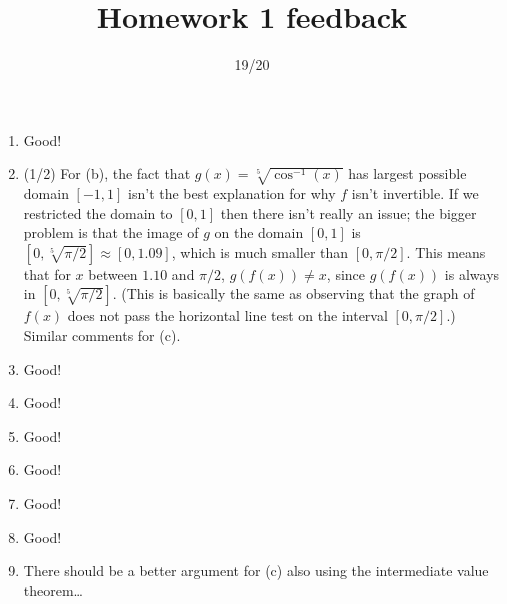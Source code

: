 \documentclass{article}
\title{Homework 1 feedback}
\author{}
\date{19/20}
\begin{document}
\maketitle
\begin{enumerate}
	\item Good!
	\item (1/2) For (b), the fact that $g(x) = \sqrt[5]{\cos^{-1}(x)}$ has largest possible domain $[-1, 1]$ isn't the best explanation for why $f$ isn't invertible. If we restricted the domain to $[0,1]$ then there isn't really an issue; the bigger problem is that the image of $g$ on the domain $[0,1]$ is $[0, \sqrt[5]{\pi/2}] \approx [0, 1.09]$, which is much smaller than $[0, \pi/2]$. This means that for $x$ between $1.10$ and $\pi/2$, $g(f(x)) \neq x$, since $g(f(x))$ is always in $[0, \sqrt[5]{\pi/2}]$. (This is basically the same as observing that the graph of $f(x)$ does not pass the horizontal line test on the interval $[0, \pi/2]$.)\\
		Similar comments for (c).
	\item Good!
	\item Good!
	\item Good!
	\item Good!
	\item Good!
	\item Good!
	\item There should be a better argument for (c) also using the intermediate value theorem\ldots
\end{enumerate}
\end{document}

